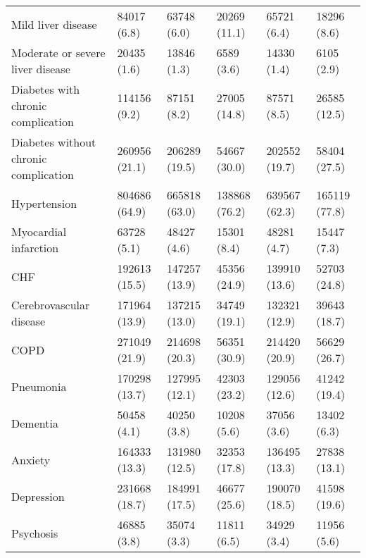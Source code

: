 \begin{adjustbox}{width={\textwidth},totalheight={\textheight},keepaspectratio,frame,padding=0ex 0ex -910ex 0ex}
{\begin{tabular}{L{20em}C{10em}C{10em}C{10em}C{10em}C{10em}}
\hspace{3mm} Mild liver disease  & 84017 (6.8) & 63748 (6.0) & 20269 (11.1) & 65721 (6.4) & 18296 (8.6)\\
\hspace{3mm} Moderate or severe liver disease  & 20435 (1.6) & 13846 (1.3) & 6589 (3.6) & 14330 (1.4) & 6105 (2.9)\\
\hspace{3mm} Diabetes with chronic complication  & 114156 (9.2) & 87151 (8.2) & 27005 (14.8) & 87571 (8.5) & 26585 (12.5)\\
\hspace{3mm} Diabetes without chronic complication  & 260956 (21.1) & 206289 (19.5) & 54667 (30.0) & 202552 (19.7) & 58404 (27.5)\\
\hspace{3mm} Hypertension  & 804686 (64.9) & 665818 (63.0) & 138868 (76.2) & 639567 (62.3) & 165119 (77.8)\\
\hspace{3mm} Myocardial infarction  & 63728 (5.1) & 48427 (4.6) & 15301 (8.4) & 48281 (4.7) & 15447 (7.3)\\
\hspace{3mm} CHF  & 192613 (15.5) & 147257 (13.9) & 45356 (24.9) & 139910 (13.6) & 52703 (24.8)\\
\hspace{3mm} Cerebrovascular disease&  171964 (13.9) & 137215 (13.0) & 34749 (19.1) & 132321 (12.9) & 39643 (18.7)\\
\hspace{3mm} COPD  & 271049 (21.9) & 214698 (20.3) & 56351 (30.9) & 214420 (20.9) & 56629 (26.7)\\
\hspace{3mm} Pneumonia  & 170298 (13.7) & 127995 (12.1) & 42303 (23.2) & 129056 (12.6) & 41242 (19.4)\\
\hspace{3mm} Dementia  & 50458 (4.1) & 40250 (3.8) & 10208 (5.6) & 37056 (3.6) & 13402 (6.3)\\
\hspace{3mm} Anxiety  & 164333 (13.3) & 131980 (12.5) & 32353 (17.8) & 136495 (13.3) & 27838 (13.1)\\
\hspace{3mm} Depression  & 231668 (18.7) & 184991 (17.5) & 46677 (25.6) & 190070 (18.5) & 41598 (19.6)\\
\hspace{3mm} Psychosis  & 46885 (3.8) & 35074 (3.3) & 11811 (6.5) & 34929 (3.4) & 11956 (5.6)\\

\end{tabular}}
\end{adjustbox}
